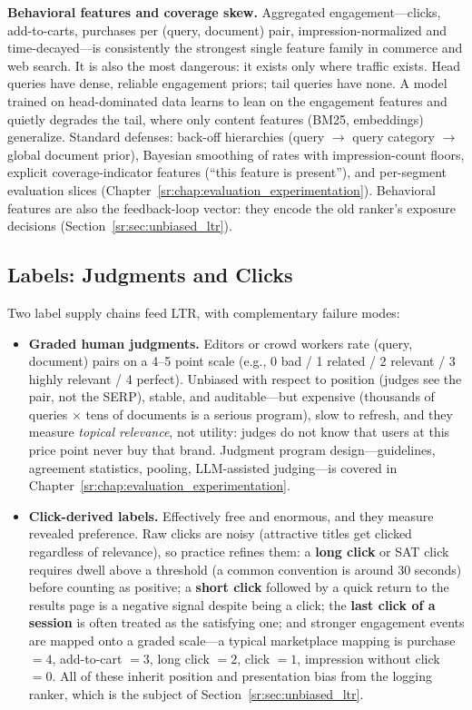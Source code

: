 \textbf{Behavioral features and coverage skew.} Aggregated engagement---clicks, add-to-carts, purchases per (query, document) pair, impression-normalized and time-decayed---is consistently the strongest single feature family in commerce and web search. It is also the most dangerous: it exists only where traffic exists. Head queries have dense, reliable engagement priors; tail queries have none. A model trained on head-dominated data learns to lean on the engagement features and quietly degrades the tail, where only content features (BM25, embeddings) generalize. Standard defenses: back-off hierarchies (query $\rightarrow$ query category $\rightarrow$ global document prior), Bayesian smoothing of rates with impression-count floors, explicit coverage-indicator features (``this feature is present''), and per-segment evaluation slices (Chapter~\ref{sr:chap:evaluation_experimentation}). Behavioral features are also the feedback-loop vector: they encode the old ranker's exposure decisions (Section~\ref{sr:sec:unbiased_ltr}).

\subsection{Labels: Judgments and Clicks}

Two label supply chains feed LTR, with complementary failure modes:

\begin{itemize}
    \item \textbf{Graded human judgments.} Editors or crowd workers rate (query, document) pairs on a 4--5 point scale (e.g., 0 bad / 1 related / 2 relevant / 3 highly relevant / 4 perfect). Unbiased with respect to position (judges see the pair, not the SERP), stable, and auditable---but expensive (thousands of queries $\times$ tens of documents is a serious program), slow to refresh, and they measure \textit{topical relevance}, not utility: judges do not know that users at this price point never buy that brand. Judgment program design---guidelines, agreement statistics, pooling, LLM-assisted judging---is covered in Chapter~\ref{sr:chap:evaluation_experimentation}.
    \item \textbf{Click-derived labels.} Effectively free and enormous, and they measure revealed preference. Raw clicks are noisy (attractive titles get clicked regardless of relevance), so practice refines them: a \textbf{long click} or SAT click requires dwell above a threshold (a common convention is around 30 seconds) before counting as positive; a \textbf{short click} followed by a quick return to the results page is a negative signal despite being a click; the \textbf{last click of a session} is often treated as the satisfying one; and stronger engagement events are mapped onto a graded scale---a typical marketplace mapping is purchase $= 4$, add-to-cart $= 3$, long click $= 2$, click $= 1$, impression without click $= 0$. All of these inherit position and presentation bias from the logging ranker, which is the subject of Section~\ref{sr:sec:unbiased_ltr}.
\end{itemize}


